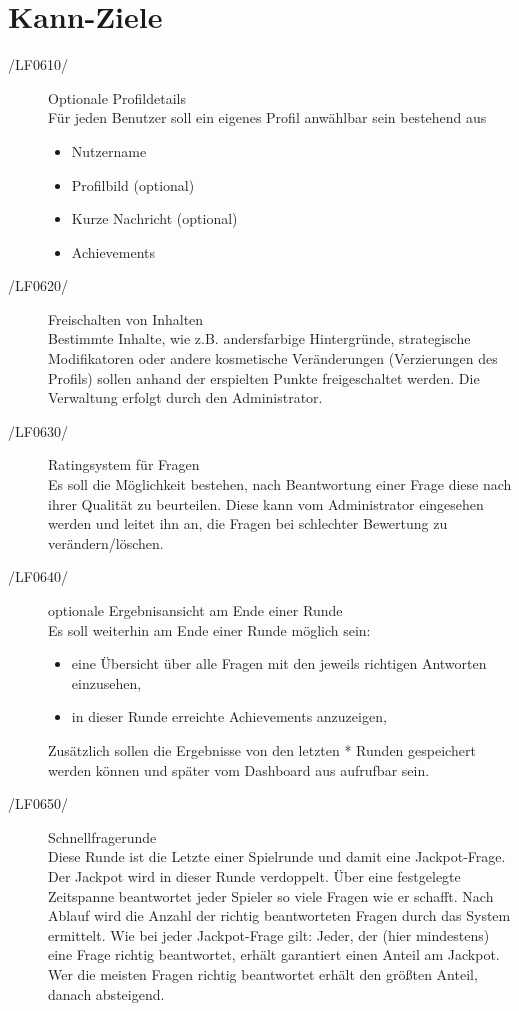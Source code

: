 \documentclass[11pt,a4paper]{scrreprt}
\begin{document}
	
\section{Kann-Ziele}
\begin{description}
\item[/LF0610/] Optionale Profildetails \\ 
Für jeden Benutzer soll ein eigenes Profil anwählbar sein bestehend aus
	\begin{itemize}
	\item Nutzername
	\item Profilbild (optional)
	\item Kurze Nachricht (optional)
	\item Achievements
	\end{itemize}
	
\item[/LF0620/] Freischalten von Inhalten \\
Bestimmte Inhalte, wie z.B. andersfarbige Hintergründe, strategische Modifikatoren oder andere kosmetische Veränderungen (Verzierungen des Profils) sollen anhand der erspielten Punkte freigeschaltet werden. Die Verwaltung erfolgt durch den Administrator.

\item[/LF0630/] Ratingsystem für Fragen \\
Es soll die Möglichkeit bestehen, nach Beantwortung einer Frage diese nach ihrer Qualität zu beurteilen. Diese kann vom Administrator eingesehen werden und leitet ihn an, die Fragen bei schlechter Bewertung zu verändern/löschen.

\item[/LF0640/] optionale Ergebnisansicht am Ende einer Runde \\
Es soll weiterhin am Ende einer Runde möglich sein:
		\begin{itemize}
		\item eine Übersicht über alle Fragen mit den jeweils richtigen Antworten einzusehen,
		\item in dieser Runde erreichte Achievements anzuzeigen,
		\end{itemize}
Zusätzlich sollen die Ergebnisse von den letzten * Runden gespeichert werden können und später vom Dashboard aus aufrufbar sein.

\item[/LF0650/] Schnellfragerunde \\
Diese Runde ist die Letzte einer Spielrunde und damit eine Jackpot-Frage. Der Jackpot wird in dieser Runde verdoppelt.
Über eine festgelegte Zeitspanne beantwortet jeder Spieler so viele Fragen wie er schafft. Nach Ablauf wird die Anzahl der richtig beantworteten Fragen durch das System ermittelt.
Wie bei jeder Jackpot-Frage gilt: Jeder, der (hier mindestens) eine Frage richtig beantwortet, erhält garantiert einen Anteil am Jackpot. Wer die meisten Fragen richtig beantwortet erhält den größten Anteil, danach absteigend.


\end{description}
\end{document}
